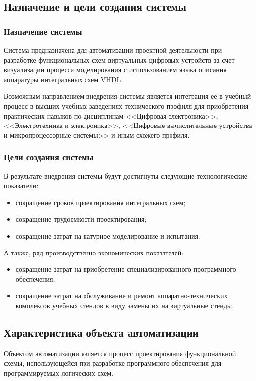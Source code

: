 \subsection{Назначение и цели создания системы} \label{sec:purpouse}
\subsubsection{Назначение системы} \label{sec:purpouse:misson}
Система предназначена для автоматизации проектной деятельности при разработке функциональных схем виртуальных цифровых устройств за счет визуализации процесса моделирования с использованием языка описания аппаратуры интегральных схем VHDL.

Возможным направлением внедрения системы является интеграция ее в учебный процесс в высших учебных заведениях технического профиля для приобретения практических навыков по дисциплинам <<Цифровая электроника>>, <<Электротехника и электроника>>, <<Цифровые вычислительные устройства и микропроцессорные системы>> и иным схожего профиля.
%
%
\subsubsection{Цели создания системы} \label{sec:purpouse:objectives}
В результате внедрения системы будут достигнуты следующие технологические показатели:
\begin{itemize}
  \item сокращение сроков проектирования интегральных схем;
  \item сокращение трудоемкости проектирования;
  \item сокращение затрат на натурное моделирование и испытания.
\end{itemize}

А также, ряд производственно-экономических показателей:
\begin{itemize}
  \item сокращение затрат на приобретение специализированного программного обеспечения;
  \item сокращение затрат на обслуживание и ремонт аппаратно-технических комплексов учебных стендов в виду замены их на виртуальные стенды.
\end{itemize}
%
%
%
\subsection{Характеристика объекта автоматизации} \label{sec:characteristics}
Объектом автоматизации является процесс проектирования функциональной схемы, использующейся при разработке программного обеспечения для программируемых логических схем.

